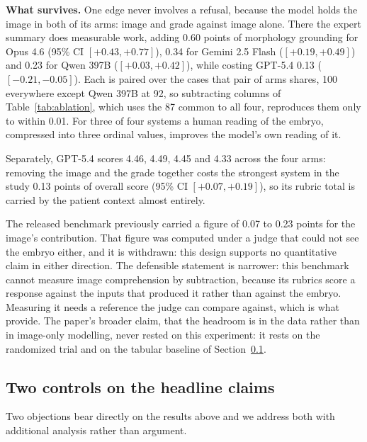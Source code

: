 \textbf{What survives.} One edge never involves a refusal, because the model
holds the image in both of its arms: image and grade against image alone. There
the expert summary does measurable work, adding 0.60 points of morphology
grounding for Opus 4.6 (95\% CI $[+0.43, +0.77]$), 0.34 for Gemini 2.5 Flash
($[+0.19, +0.49]$) and 0.23 for Qwen 397B ($[+0.03, +0.42]$), while costing
GPT-5.4 0.13 ($[-0.21, -0.05]$). Each is paired over the cases that pair of arms
shares, 100 everywhere except Qwen 397B at 92, so subtracting columns of
Table~\ref{tab:ablation}, which uses the 87 common to all four, reproduces them
only to within 0.01. For three of four systems a human reading of the embryo,
compressed into three ordinal values, improves the model's own reading of it.

Separately, GPT-5.4 scores 4.46, 4.49, 4.45 and 4.33 across the four arms:
removing the image and the grade together costs the strongest system in the study
0.13 points of overall score (95\% CI $[+0.07, +0.19]$), so its rubric total is
carried by the patient context almost entirely.

The released benchmark previously carried a figure of 0.07 to 0.23 points for
the image's contribution. That figure was computed under a judge that could not
see the embryo either, and it is withdrawn: this design supports no quantitative
claim in either direction. The defensible statement is narrower: this benchmark
cannot measure image comprehension by subtraction, because its rubrics score a
response against the inputs that produced it rather than against the embryo.
Measuring it needs a reference the judge can compare against, which is what
\citet{neu2026dataset} provide. The paper's broader claim, that the headroom is
in the data rather than in image-only modelling, never rested on this experiment:
it rests on the randomized trial \citep{illingworth2024} and on the tabular
baseline of Section~\ref{sec:controls}.

\subsection{Two controls on the headline claims}
\label{sec:controls}

Two objections bear directly on the results above and we address both with
additional analysis rather than argument.

